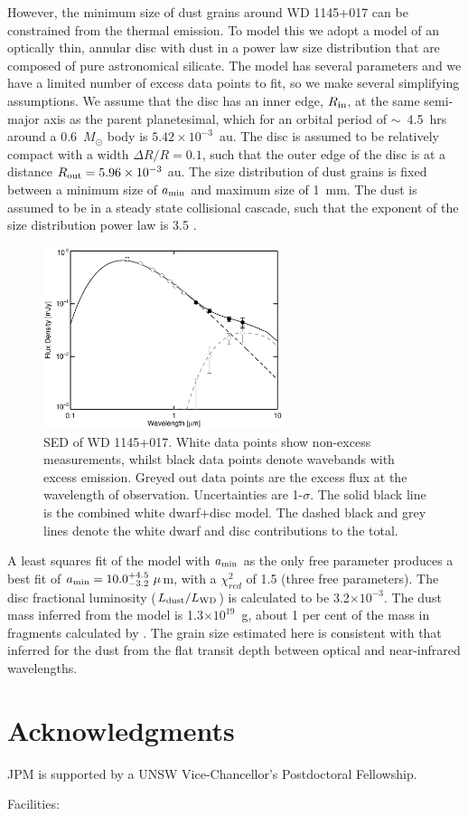 \documentclass[iop,useAMES,usenatbig]{emulateapj}
\begin{document}
However, the minimum size of dust grains around WD 1145+017 can be constrained from the thermal emission. To model this we adopt a model of an optically thin, annular disc with dust in a power law size distribution that are composed of pure astronomical silicate. The model has several parameters and we have a limited number of excess data points to fit, so we make several simplifying assumptions. We assume that the disc has an inner edge, $R_{\rm in}$, at the same semi-major axis as the parent planetesimal, which for an orbital period of $\sim$~4.5~hrs around a 0.6~$M_{\odot}$ body is $5.42\times10^{-3}$~au. The disc is assumed to be relatively compact with a width $\Delta R/R = 0.1$, such that the outer edge of the disc is at a distance $R_{\rm out} = 5.96\times10^{-3}~$au. The size distribution of dust grains is fixed between a minimum size of $a_{\rm min}$ and maximum size of 1~mm. The dust is assumed to be in a steady state collisional cascade, such that the exponent of the size distribution power law is 3.5 \citep{1969JGR....74.2531D}.

\begin{figure}
    \centering
    \includegraphics[width=7cm]{plots/wd1145p017_sed_astrosil.eps}
    \caption{SED of WD 1145+017. White data points show non-excess measurements, whilst black data points denote wavebands with excess emission. Greyed out data points are the excess flux at the wavelength of observation. Uncertainties are 1-$\sigma$. The solid black line is the combined white dwarf+disc model. The dashed black and grey lines denote the white dwarf and disc contributions to the total. \label{fig:wd1145p017_sed}}
\end{figure}

A least squares fit of the model with $a_{\rm min}$ as the only free parameter produces a best fit of $a_{\rm min} = 10.0^{+4.5}_{-3.2}~\mu$m, with a $\chi^{2}_{red}$ of 1.5 (three free parameters). The disc fractional luminosity ($L_{\rm dust}/L_{\rm WD}$) is calculated to be 3.2$\times10^{-3}$. The dust mass inferred from the model is 1.3$\times10^{19}$~g, about 1 per cent of the mass in fragments calculated by \cite{2015Natur.526..546V}. The grain size estimated here is consistent with that inferred for the dust from the flat transit depth between optical and near-infrared wavelengths. 


\section{Acknowledgments}

JPM is supported by a UNSW Vice-Chancellor's Postdoctoral Fellowship.

Facilities: 



\end{document}
